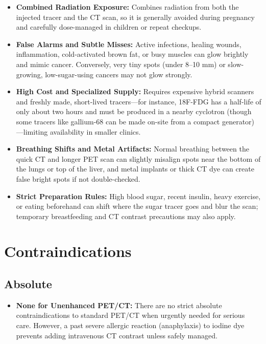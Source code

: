 \begin{itemize}
    \item \textbf{Combined Radiation Exposure:} Combines radiation from both the injected tracer and the CT scan, so it is generally avoided during pregnancy and carefully dose-managed in children or repeat checkups.
    \item \textbf{False Alarms and Subtle Misses:} Active infections, healing wounds, inflammation, cold-activated brown fat, or busy muscles can glow brightly and mimic cancer. Conversely, very tiny spots (under 8--10 mm) or slow-growing, low-sugar-using cancers may not glow strongly.
    \item \textbf{High Cost and Specialized Supply:} Requires expensive hybrid scanners and freshly made, short-lived tracers---for instance, 18F-FDG has a half-life of only about two hours and must be produced in a nearby cyclotron (though some tracers like gallium-68 can be made on-site from a compact generator)---limiting availability in smaller clinics.
    \item \textbf{Breathing Shifts and Metal Artifacts:} Normal breathing between the quick CT and longer PET scan can slightly misalign spots near the bottom of the lungs or top of the liver, and metal implants or thick CT dye can create false bright spots if not double-checked.
    \item \textbf{Strict Preparation Rules:} High blood sugar, recent insulin, heavy exercise, or eating beforehand can shift where the sugar tracer goes and blur the scan; temporary breastfeeding and CT contrast precautions may also apply.
\end{itemize}

\section{Contraindications}

\subsection{Absolute}

\begin{itemize}
    \item \textbf{None for Unenhanced PET/CT:} There are no strict absolute contraindications to standard PET/CT when urgently needed for serious care. However, a past severe allergic reaction (anaphylaxis) to iodine dye prevents adding intravenous CT contrast unless safely managed.
\end{itemize}

